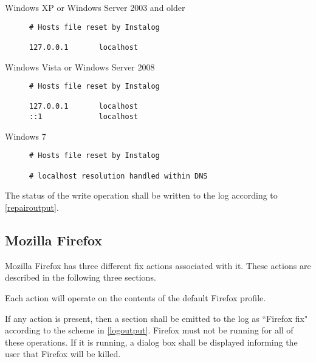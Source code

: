 \begin{description}
\item[Windows XP or Windows Server 2003 and older] \hfill 
\begin{verbatim}
# Hosts file reset by Instalog

127.0.0.1       localhost
\end{verbatim}
\item[Windows Vista or Windows Server 2008] \hfill 
\begin{verbatim}
# Hosts file reset by Instalog

127.0.0.1       localhost
::1             localhost
\end{verbatim}
\item[Windows 7] \hfill 
\begin{verbatim}
# Hosts file reset by Instalog

# localhost resolution handled within DNS
\end{verbatim}
\end{description}

The status of the write operation shall be written to the log according to
\ref{repairoutput}.  

\subsection{Mozilla Firefox}
Mozilla Firefox has three different fix actions associated with it.  These
actions are described in the following three sections.

Each action will operate on the contents of the default Firefox profile.

If any action is present, then a section shall be emitted to the log as
``Firefox fix" according to the scheme in \ref{logoutput}.  Firefox must not
be running for all of these operations.  If it is running, a dialog box shall
be displayed informing the user that Firefox will be killed.  

